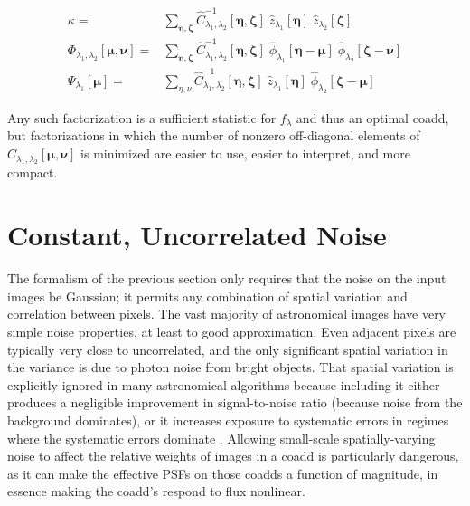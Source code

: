 \documentclass[DM,authoryear,toc]{lsstdoc}
\begin{document}
\begin{align}
    \kappa = &
        \sum_{\bm{\eta},\bm{\zeta}}
        \hat{C}^{-1}_{\lambda_1,\lambda_2}[\bm{\eta},\bm{\zeta}]
        \;\hat{z}_{\lambda_1}[\bm{\eta}]
        \;\hat{z}_{\lambda_2}[\bm{\zeta}]
    \label{eqn:kappa-factorization}
    \\
    \Phi_{\lambda_1,\lambda_2}[\bm{\mu},\bm{\nu}] =&
        \sum_{\bm{\eta},\bm{\zeta}}
        \hat{C}^{-1}_{\lambda_1,\lambda_2}[\bm{\eta},\bm{\zeta}]
        \;\hat{\phi}_{\lambda_1}[\bm{\eta}-\bm{\mu}]
        \;\hat{\phi}_{\lambda_2}[\bm{\zeta}-\bm{\nu}]
    \label{eqn:phi-factorization}
    \\
    \Psi_{\lambda_1}[\bm{\mu}] = &
        \sum_{\eta,\nu}
        \hat{C}_{\lambda_1,\lambda_2}^{-1}\![\bm{\eta},\bm{\zeta}]
        \; \hat{z}_{\lambda_1}[\bm{\eta}]
        \; \hat{\phi}_{\lambda_2}\![\bm{\zeta}-\bm{\mu}]
    \label{eqn:psi-factorization}
\end{align}

Any such factorization is a sufficient statistic for $f_{\lambda}$ and thus an optimal coadd, but factorizations in which the number of nonzero off-diagonal elements of $\hat{C}_{\lambda_1,\lambda_2}[\bm{\mu},\bm{\nu}]$ is minimized are easier to use, easier to interpret, and more compact.

\section{Constant, Uncorrelated Noise}

The formalism of the previous section only requires that the noise on the input images be Gaussian; it permits any combination of spatial variation and correlation between pixels.
The vast majority of astronomical images have very simple noise properties, at least to good approximation.
Even adjacent pixels are typically very close to uncorrelated, and the only significant spatial variation in the variance is due to photon noise from bright objects.
That spatial variation is explicitly ignored in many astronomical algorithms because including it either produces a negligible improvement in signal-to-noise ratio (because noise from the background dominates), or it increases exposure to systematic errors in regimes where the systematic errors dominate \citep[e.g. PSF photometry of bright stars;][]{2018PASJ...70S...5B}.
Allowing small-scale spatially-varying noise to affect the relative weights of images in a coadd is particularly dangerous, as it can make the effective PSFs on those coadds a function of magnitude, in essence making the coadd's respond to flux nonlinear.
\end{document}
